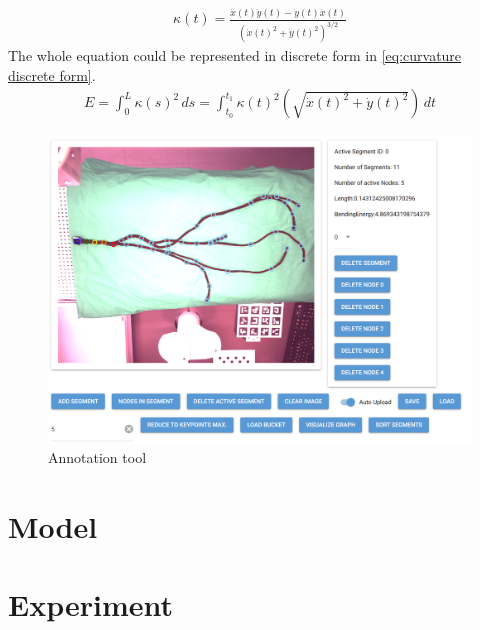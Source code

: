     \begin{equation}
        \begin{aligned}
            \kappa(t) = \frac{\dot{x}(t) \ddot{y}(t) - \dot{y}(t) \ddot{x}(t)}{(\dot{x}(t)^2 + \dot{y}(t)^2)^{3/2}}
            \label{eq:curvature}
        \end{aligned}
    \end{equation}
    The whole equation could be represented in discrete form in \autoref{eq:curvature discrete form}.
    \begin{equation}
        \begin{aligned}
            E = \int_{0}^{L} \kappa(s)^2 \, ds = \int_{t_0}^{t_1} \kappa(t)^2 \left( \sqrt{\dot{x}(t)^2 + \dot{y}(t)^2} \right) \, dt
            \label{eq:curvature discrete form}
        \end{aligned}
    \end{equation}
    \begin{figure}
        \centering
        \includegraphics[width=0.9\linewidth]{example_images/NiceGUIInterface.png}
        \caption{Annotation tool}
        \label{Annotation tool}
    \end{figure}
\section{Model}
\section{Experiment}